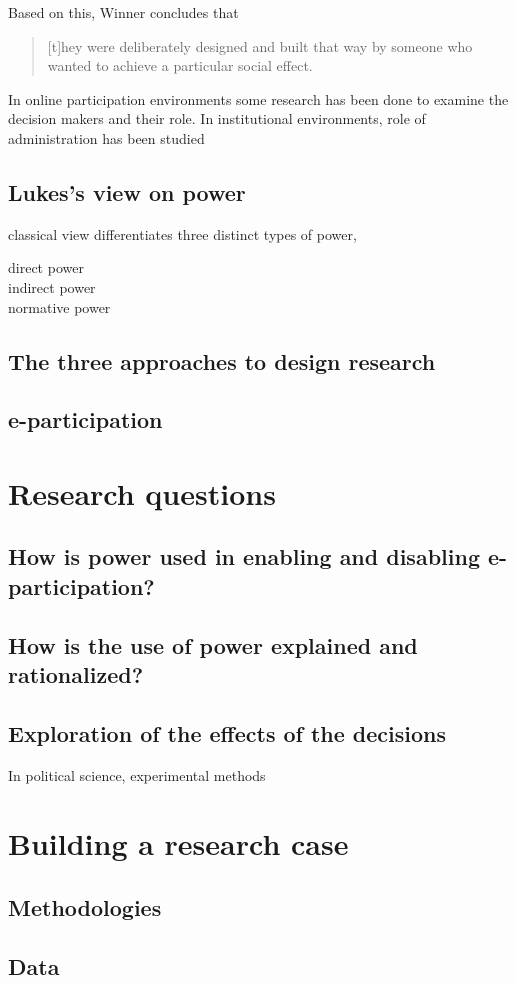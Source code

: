 \documentclass[12pt,a4paper]{article}
\begin{document}
Based on this, Winner concludes that

\begin{quote}
[t]hey were deliberately designed and built that way by someone who wanted to achieve a particular social effect.
\end{quote}

In online participation environments some research has been done to examine the decision makers and their role. In institutional environments, role of administration has been studied 

\subsection{Lukes's view on power}

 classical view differentiates three distinct types of power,

\begin{description}
\item[direct power]
\item[indirect power]
\item[normative power]
\end{description}

\subsection{The three approaches to design research}

\subsection{e-participation}

\section{Research questions}

\subsection{How is power used in enabling and disabling e-participation?}

\subsection{How is the use of power explained and rationalized?}

\subsection{Exploration of the effects of the decisions}

In political science, experimental methods

\section{Building a research case}

\subsection{Methodologies}

\subsection{Data}



\end{document}
